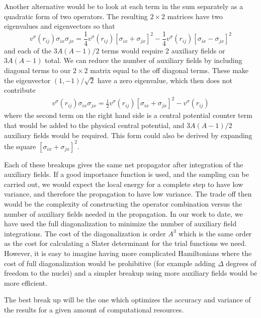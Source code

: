 Another alternative would be to look at each term in the sum separately as
a quadratic form of two operators. The resulting $2\times 2$ matrices
have two eigenvalues and eigenvectors so that
\begin{equation}
v^\sigma(r_{ij}) \sigma_{ix} \sigma_{jx}  =
\frac{1}{4} v^\sigma(r_{ij})[\sigma_{ix}+\sigma_{jx}]^2
-\frac{1}{4} v^\sigma(r_{ij})[\sigma_{ix}-\sigma_{jx}]^2
\end{equation}
and each of the $3A(A-1)/2$ terms would require 2 auxiliary fields or
$3A(A-1)$ total. We can reduce the number of auxiliary fields by including
diagonal terms to our $2\times 2$ matrix equal to the off diagonal terms.
These make the eigenvector $(1,-1)/\sqrt{2}$ have a zero eigenvalue,
which then does not contribute
\begin{eqnarray}
v^\sigma(r_{ij}) \sigma_{ix} \sigma_{jx}  =
\frac{1}{2} v^\sigma(r_{ij})[\sigma_{ix}+\sigma_{jx}]^2
-v^\sigma(r_{ij})
\end{eqnarray}
where the second term on the right hand side
is a central potential counter term that would be added
to the physical central potential, and $3A(A-1)/2$ auxiliary fields
would be required. This form could also be derived by expanding
the square $[\sigma_{ix}+\sigma_{jx}]^2$.

Each of these breakups gives the same net propagator after integration
of the auxiliary fields. If a good importance function is used, and the
sampling can be carried out, we would expect the local energy for a 
complete step to have low variance, and therefore the propagation to
have low variance. The trade off then would be the complexity of constructing
the operator combination versus the number of auxiliary fields needed
in the propagation. In our work to date, we have used the full
diagonalization to minimize the number of auxiliary field integrations.
The cost of the diagonalization is order $A^3$ which is the same order
as the cost for calculating a Slater determinant for the trial functions
we need. However, it is easy to imagine having more complicated Hamiltonians
where the cost of full diagonalization would be prohibitive (for example
adding $\Delta$ degrees of freedom to the nuclei) and a simpler breakup
using more auxiliary fields would be more efficient.

The best break up will be the one which optimizes the accuracy and variance
of the results for a given amount of computational resources.

